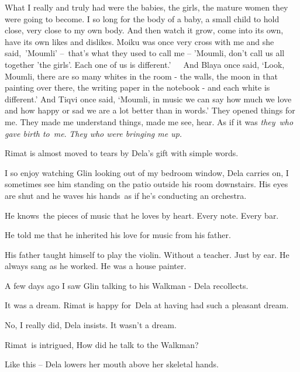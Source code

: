 \documentclass[twoside,11pt]{book}
\begin{document}
{\textquotedbl}What I really and truly had were the babies, the girls, the mature women they were going to become. I so
long for the body of a baby, a small child to hold close, very close to my own body. And then watch it grow, come into
its own, have its own likes and dislikes. Moiku was once very cross with me and she said,\ {}'Moumli' --\ that's what
they used to call me -- 'Moumli, don't call us all together 'the girls'. Each one of us is different.'\ \ \ And Blaya
once said, `Look, Moumli, there are so many whites in the room - the walls, the moon in that painting over there, the
writing paper in the notebook - and each white is different.' And Tiqvi once said, `Moumli, in music we can say how
much we love and how happy or sad we are a lot better than in words.' They opened things for me. They made me
understand things, made me see, hear. As if it was \textit{they}\ \textit{who gave birth to}\ \textit{me}.\textit{ They
who were bringing me up.}{\textquotedbl}

Rimat is almost moved to tears by Dela's gift with simple words.

{\textquotedbl}I so enjoy watching Glin looking out of my bedroom window,{\textquotedbl} Dela carries on,
{\textquotedbl}I sometimes see him standing on the patio outside his room downstairs. His eyes are shut and he waves
his hands~as if he's conducting an orchestra.{\textquotedbl} 

{\textquotedbl}He knows\ the pieces of music that he loves by heart. Every note. Every bar.{\textquotedbl}

{\textquotedbl}He told me that he inherited his love for music from his father.{\textquotedbl}

{\textquotedbl}His father taught himself to play the violin. Without a teacher. Just by ear. He always sang as he
worked. He was a house painter.{\textquotedbl}

{\textquotedbl}A few days ago I saw Glin talking to his Walkman -{\textquotedbl} Dela recollects.

{\textquotedbl}It was a dream.{\textquotedbl} Rimat is happy for~Dela at having had such a pleasant dream.

{\textquotedbl}No, I really did,{\textquotedbl} Dela insists. {\textquotedbl}It wasn't a dream.{\textquotedbl}

Rimat~is intrigued, {\textquotedbl}How did he talk to the Walkman?{\textquotedbl}

{\textquotedbl}Like this --{\textquotedbl} Dela lowers her mouth above her skeletal hands. 
\end{document}
